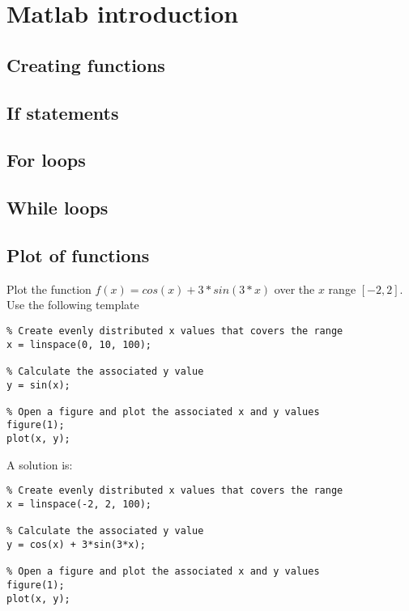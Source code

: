 \section{Matlab introduction}


\subsection{Creating functions}

\subsection{If statements}

\subsection{For loops}

\subsection{While loops}


\subsection{Plot of functions}

\begin{ex}
Plot the function $f(x) = cos(x) + 3*sin(3*x)$
over the $x$ range $[-2, 2]$.
Use the following template 
\begin{lstlisting}
% Create evenly distributed x values that covers the range
x = linspace(0, 10, 100);

% Calculate the associated y value
y = sin(x);

% Open a figure and plot the associated x and y values
figure(1);
plot(x, y);
\end{lstlisting}
\begin{hint}
\end{hint}
\begin{sol}
A solution is:
\begin{lstlisting}
% Create evenly distributed x values that covers the range
x = linspace(-2, 2, 100);

% Calculate the associated y value
y = cos(x) + 3*sin(3*x);

% Open a figure and plot the associated x and y values
figure(1);
plot(x, y);
\end{lstlisting}
\end{sol}
\end{ex}



